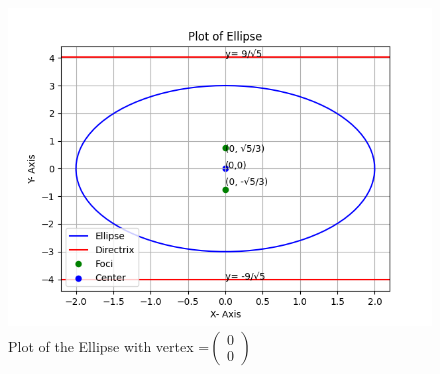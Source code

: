 \documentclass[twocolumn]{article}
\theoremstyle{remark}
\newcommand{\myvec}[1]{\ensuremath{\begin{pmatrix}#1\end{pmatrix}}}
\numberwithin{equation}{subsection}
\let\vec\mathbf
\begin{document}
\begin{figure}[!ht]
\includegraphics[width=1.1\columnwidth]{Figure_1.png}
\caption{Plot of the Ellipse with vertex \vec{c}=\myvec{0 \\ 0}}
\label{fig}
\end{figure}
\end{document}

